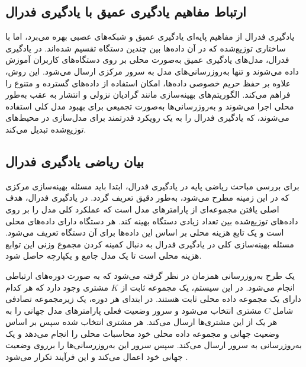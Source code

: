 \subsection{ارتباط مفاهیم یادگیری عمیق با یادگیری فدرال}
یادگیری فدرال از مفاهیم پایه‌ای یادگیری عمیق و شبکه‌های عصبی بهره می‌برد، اما با ساختاری توزیع‌شده که در آن داده‌ها بین چندین دستگاه تقسیم شده‌اند. در یادگیری فدرال، مدل‌های یادگیری عمیق به‌صورت محلی بر روی دستگاه‌های کاربران آموزش داده می‌شوند و تنها به‌روزرسانی‌های مدل به سرور مرکزی ارسال می‌شود. این روش، علاوه بر حفظ حریم خصوصی داده‌ها، امکان استفاده از داده‌های گسترده و متنوع را فراهم می‌کند. الگوریتم‌های بهینه‌سازی مانند گرادیان نزولی و انتشار به عقب به‌طور محلی اجرا می‌شوند و به‌روزرسانی‌ها به‌صورت تجمیعی برای بهبود مدل کلی استفاده می‌شوند، که یادگیری فدرال را به یک رویکرد قدرتمند برای مدل‌سازی در محیط‌های توزیع‌شده تبدیل می‌کند.



\subsection{بیان ریاضی یادگیری فدرال}
برای بررسی مباحث ریاضی پایه در یادگیری فدرال، ابتدا باید مسئله بهینه‌سازی مرکزی که در این زمینه مطرح می‌شود، به‌طور دقیق تعریف گردد. در یادگیری فدرال، هدف اصلی یافتن مجموعه‌ای از پارامترهای مدل است که عملکرد کلی مدل را بر روی داده‌های توزیع‌شده بین تعداد زیادی دستگاه بهینه کند. هر دستگاه دارای داده‌های محلی است و یک تابع هزینه محلی بر اساس این داده‌ها برای آن دستگاه تعریف می‌شود. مسئله بهینه‌سازی کلی در یادگیری فدرال به دنبال کمینه کردن مجموع وزنی این توابع هزینه محلی است تا یک مدل جامع و یکپارچه حاصل شود.

یک طرح به‌روزرسانی همزمان در نظر گرفته می‌شود که به صورت دوره‌های ارتباطی انجام می‌شود. در این سیستم، یک مجموعه ثابت از
$K$
مشتری وجود دارد که هر کدام دارای یک مجموعه داده محلی ثابت هستند. در ابتدای هر دوره، یک زیرمجموعه تصادفی شامل
$C$
مشتری‌ انتخاب می‌شود و سرور وضعیت فعلی پارامترهای مدل جهانی را به هر یک از این مشتری‌ها ارسال می‌کند. هر مشتری انتخاب ‌شده سپس بر اساس وضعیت جهانی و مجموعه داده محلی خود محاسبات محلی را انجام می‌دهد و یک به‌روزرسانی به سرور ارسال می‌کند. سپس سرور این به‌روزرسانی‌ها را برروی وضعیت جهانی خود اعمال می‌کند و این فرآیند تکرار می‌شود
\cite{mcmahan2017communication}.

